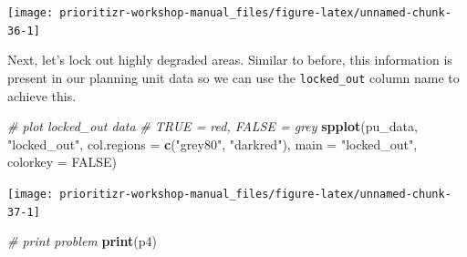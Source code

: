 \documentclass[12pt,]{book}
\newenvironment{Shaded}{\begin{snugshade}}{\end{snugshade}}
\newcommand{\KeywordTok}[1]{\textcolor[rgb]{0.13,0.29,0.53}{\textbf{#1}}}
\newcommand{\DataTypeTok}[1]{\textcolor[rgb]{0.13,0.29,0.53}{#1}}
\newcommand{\FloatTok}[1]{\textcolor[rgb]{0.00,0.00,0.81}{#1}}
\newcommand{\StringTok}[1]{\textcolor[rgb]{0.31,0.60,0.02}{#1}}
\newcommand{\CommentTok}[1]{\textcolor[rgb]{0.56,0.35,0.01}{\textit{#1}}}
\newcommand{\OtherTok}[1]{\textcolor[rgb]{0.56,0.35,0.01}{#1}}
\newcommand{\OperatorTok}[1]{\textcolor[rgb]{0.81,0.36,0.00}{\textbf{#1}}}
\newcommand{\NormalTok}[1]{#1}
\begin{document}
\begin{center}\texttt{[image: prioritizr-workshop-manual\_files/figure-latex/unnamed-chunk-36-1]} \end{center}

Next, let's lock out highly degraded areas. Similar to before, this
information is present in our planning unit data so we can use the
\texttt{locked\_out} column name to achieve this.

\begin{Shaded}
\begin{Highlighting}[]
\CommentTok{# plot locked_out data}
\CommentTok{# TRUE = red, FALSE = grey}
\KeywordTok{spplot}\NormalTok{(pu_data, }\StringTok{"locked_out"}\NormalTok{, }\DataTypeTok{col.regions =} \KeywordTok{c}\NormalTok{(}\StringTok{"grey80"}\NormalTok{, }\StringTok{"darkred"}\NormalTok{),}
       \DataTypeTok{main =} \StringTok{"locked_out"}\NormalTok{, }\DataTypeTok{colorkey =} \OtherTok{FALSE}\NormalTok{)}
\end{Highlighting}
\end{Shaded}

\begin{center}\texttt{[image: prioritizr-workshop-manual\_files/figure-latex/unnamed-chunk-37-1]} \end{center}

\begin{Shaded}
\end{Shaded}

\begin{Shaded}
\begin{Highlighting}[]
\CommentTok{# print problem}
\KeywordTok{print}\NormalTok{(p4)}
\end{Highlighting}
\end{Shaded}
\end{document}
